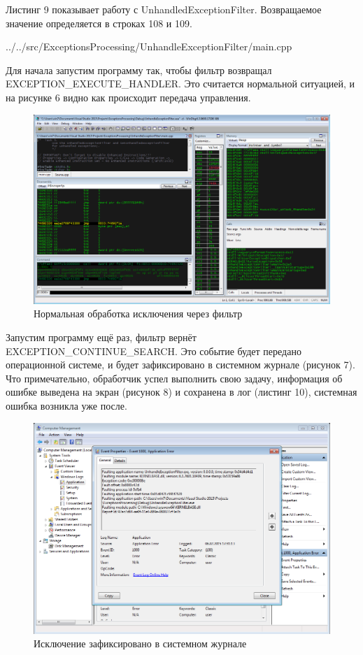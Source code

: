 \documentclass[a4paper, 12pt]{report}		%
\begin{document}
Листинг 9 показывает работу с UnhandledExceptionFilter. Возвращаемое значение определяется в строках 108 и 109.


{../../src/ExceptionsProcessing/UnhandleExceptionFilter/main.cpp}

Для начала запустим программу так, чтобы фильтр возвращал EXCEPTION\_EXECUTE\_HANDLER. Это считается нормальной ситуацией, и на рисунке 6 видно как происходит передача управления.

\begin{figure}[h!]
\centering
\includegraphics[scale=0.5]{res/006}
\caption{Нормальная обработка исключения через фильтр}
\end{figure}

Запустим программу ещё раз,  фильтр вернёт EXCEPTION\_CONTINUE\_SEARCH. Это событие будет передано операционной системе, и будет зафиксировано в системном журнале (рисунок 7). Что примечательно, обработчик успел выполнить свою задачу, информация об ошибке выведена на экран (рисунок 8) и сохранена в лог (листинг 10), системная ошибка возникла уже после.

\begin{figure}[h!]
\centering
\includegraphics[scale=0.63]{res/007}
\caption{Исключение зафиксировано в системном журнале}
\end{figure}
\end{document}
